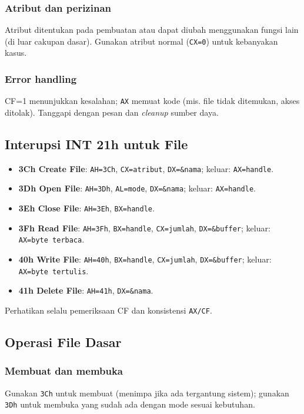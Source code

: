 \subsubsection{Atribut dan perizinan}
Atribut ditentukan pada pembuatan atau dapat diubah menggunakan fungsi lain (di luar cakupan dasar). Gunakan atribut normal (\texttt{CX=0}) untuk kebanyakan kasus.

\subsubsection{Error handling}
CF=1 menunjukkan kesalahan; \texttt{AX} memuat kode (mis. file tidak ditemukan, akses ditolak). Tanggapi dengan pesan dan \textit{cleanup} sumber daya.

\subsection{Interupsi INT 21h untuk File}
\begin{itemize}
  \item \textbf{3Ch Create File}: \texttt{AH=3Ch}, \texttt{CX=atribut}, \texttt{DX=\&nama}; keluar: \texttt{AX=handle}.
  \item \textbf{3Dh Open File}: \texttt{AH=3Dh}, \texttt{AL=mode}, \texttt{DX=\&nama}; keluar: \texttt{AX=handle}.
  \item \textbf{3Eh Close File}: \texttt{AH=3Eh}, \texttt{BX=handle}.
  \item \textbf{3Fh Read File}: \texttt{AH=3Fh}, \texttt{BX=handle}, \texttt{CX=jumlah}, \texttt{DX=\&buffer}; keluar: \texttt{AX=byte terbaca}.
  \item \textbf{40h Write File}: \texttt{AH=40h}, \texttt{BX=handle}, \texttt{CX=jumlah}, \texttt{DX=\&buffer}; keluar: \texttt{AX=byte tertulis}.
  \item \textbf{41h Delete File}: \texttt{AH=41h}, \texttt{DX=\&nama}.
\end{itemize}
Perhatikan selalu pemeriksaan CF dan konsistensi \texttt{AX/CF}.

\subsection{Operasi File Dasar}
\subsubsection{Membuat dan membuka}
Gunakan \texttt{3Ch} untuk membuat (menimpa jika ada tergantung sistem); gunakan \texttt{3Dh} untuk membuka yang sudah ada dengan mode sesuai kebutuhan.

